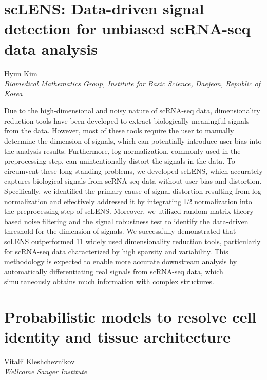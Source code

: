 \section*{scLENS: Data-driven signal detection for unbiased scRNA-seq data analysis}

\begin{center}
Hyun Kim \\
\vspace{0.2cm}
\textit{Biomedical Mathematics Group, Institute for Basic Science, Daejeon, Republic of Korea} \\
\end{center}

\noindent
Due to the high-dimensional and noisy nature of scRNA-seq data, dimensionality reduction tools have been developed to extract biologically meaningful signals from the data. However, most of these tools require the user to manually determine the dimension of signals, which can potentially introduce user bias into the analysis results. Furthermore, log normalization, commonly used in the preprocessing step, can unintentionally distort the signals in the data. To circumvent these long-standing problems, we developed scLENS, which accurately captures biological signals from scRNA-seq data without user bias and distortion. Specifically, we identified the primary cause of signal distortion resulting from log normalization and effectively addressed it by integrating L2 normalization into the preprocessing step of scLENS. Moreover, we utilized random matrix theory-based noise filtering and the signal robustness test to identify the data-driven threshold for the dimension of signals. We successfully demonstrated that scLENS outperformed 11 widely used dimensionality reduction tools, particularly for scRNA-seq data characterized by high sparsity and variability. This methodology is expected to enable more accurate downstream analysis by automatically differentiating real signals from scRNA-seq data, which simultaneously obtains much information with complex structures.
\newpage

\section*{Probabilistic models to resolve cell identity and tissue architecture}

\begin{center}
Vitalii Kleshchevnikov \\
\vspace{0.2cm}
\textit{Wellcome Sanger Institute} \\
\end{center}

